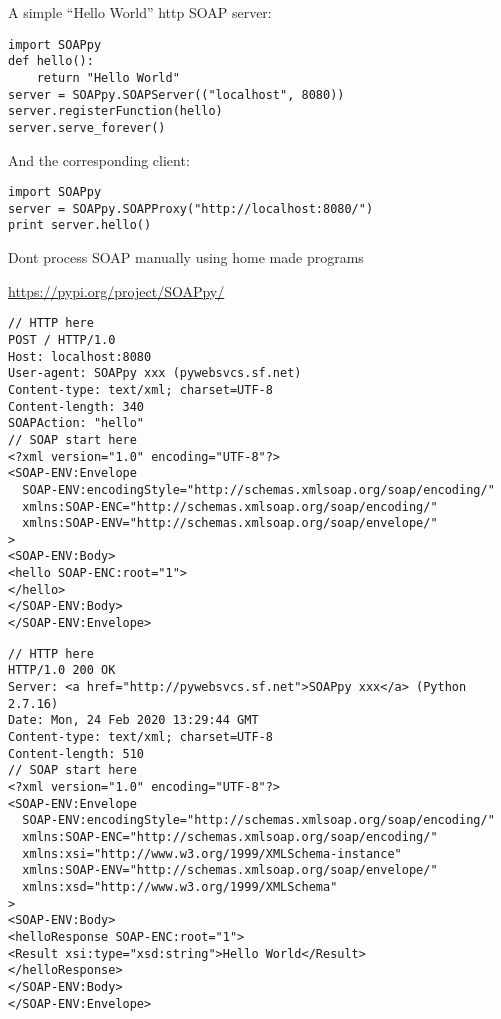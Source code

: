 \documentclass[Screen16to9,17pt]{foils}
\begin{document}

A simple “Hello World” http SOAP server:

\begin{verbatim}
import SOAPpy
def hello():
    return "Hello World"
server = SOAPpy.SOAPServer(("localhost", 8080))
server.registerFunction(hello)
server.serve_forever()
\end{verbatim}
And the corresponding client:

\begin{verbatim}
import SOAPpy
server = SOAPpy.SOAPProxy("http://localhost:8080/")
print server.hello()
\end{verbatim}


\begin{list2}
\item Dont process SOAP manually using home made programs
\item \url{https://pypi.org/project/SOAPpy/}
\end{list2}



\begin{verbatim}
// HTTP here
POST / HTTP/1.0
Host: localhost:8080
User-agent: SOAPpy xxx (pywebsvcs.sf.net)
Content-type: text/xml; charset=UTF-8
Content-length: 340
SOAPAction: "hello"
// SOAP start here
<?xml version="1.0" encoding="UTF-8"?>
<SOAP-ENV:Envelope
  SOAP-ENV:encodingStyle="http://schemas.xmlsoap.org/soap/encoding/"
  xmlns:SOAP-ENC="http://schemas.xmlsoap.org/soap/encoding/"
  xmlns:SOAP-ENV="http://schemas.xmlsoap.org/soap/envelope/"
>
<SOAP-ENV:Body>
<hello SOAP-ENC:root="1">
</hello>
</SOAP-ENV:Body>
</SOAP-ENV:Envelope>
\end{verbatim}


\begin{verbatim}
// HTTP here
HTTP/1.0 200 OK
Server: <a href="http://pywebsvcs.sf.net">SOAPpy xxx</a> (Python 2.7.16)
Date: Mon, 24 Feb 2020 13:29:44 GMT
Content-type: text/xml; charset=UTF-8
Content-length: 510
// SOAP start here
<?xml version="1.0" encoding="UTF-8"?>
<SOAP-ENV:Envelope
  SOAP-ENV:encodingStyle="http://schemas.xmlsoap.org/soap/encoding/"
  xmlns:SOAP-ENC="http://schemas.xmlsoap.org/soap/encoding/"
  xmlns:xsi="http://www.w3.org/1999/XMLSchema-instance"
  xmlns:SOAP-ENV="http://schemas.xmlsoap.org/soap/envelope/"
  xmlns:xsd="http://www.w3.org/1999/XMLSchema"
>
<SOAP-ENV:Body>
<helloResponse SOAP-ENC:root="1">
<Result xsi:type="xsd:string">Hello World</Result>
</helloResponse>
</SOAP-ENV:Body>
</SOAP-ENV:Envelope>
\end{verbatim}
\end{document}
